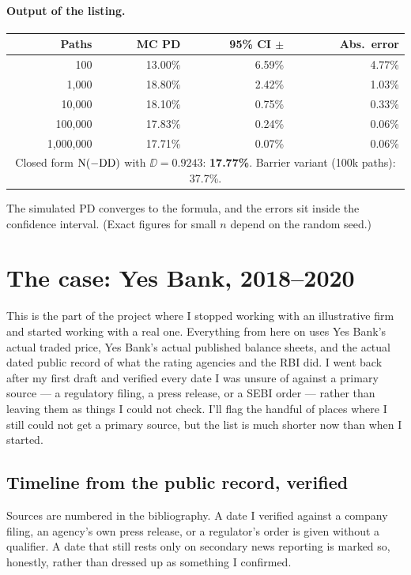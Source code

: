 

\paragraph{Output of the listing.}
\begin{center}\small
\begin{tabular}{rrrr}\toprule
\textbf{Paths} & \textbf{MC PD} & \textbf{95\% CI $\pm$} & \textbf{Abs.\ error}\\\midrule
100 & 13.00\% & 6.59\% & 4.77\%\\
1,000 & 18.80\% & 2.42\% & 1.03\%\\
10,000 & 18.10\% & 0.75\% & 0.33\%\\
100,000 & 17.83\% & 0.24\% & 0.06\%\\
1,000,000 & 17.71\% & 0.07\% & 0.06\%\\\midrule
\multicolumn{4}{c}{Closed form $\mathrm{N}(-\mathrm{DD})$ with $\DD=0.9243$: \textbf{17.77\%}. Barrier variant (100k paths): 37.7\%.}\\\bottomrule
\end{tabular}
\end{center}
The simulated PD converges to the formula, and the errors sit inside the confidence interval. (Exact figures for small $n$ depend on the random seed.)

\section{The case: Yes Bank, 2018--2020}
\label{sec:case}

This is the part of the project where I stopped working with an illustrative firm and started working with a real one. Everything from here on uses Yes Bank's actual traded price, Yes Bank's actual published balance sheets, and the actual dated public record of what the rating agencies and the RBI did. I went back after my first draft and verified every date I was unsure of against a primary source — a regulatory filing, a press release, or a SEBI order — rather than leaving them as things I could not check. I'll flag the handful of places where I still could not get a primary source, but the list is much shorter now than when I started.

\subsection{Timeline from the public record, verified}
Sources are numbered in the bibliography. A date I verified against a company filing, an agency's own press release, or a regulator's order is given without a qualifier. A date that still rests only on secondary news reporting is marked so, honestly, rather than dressed up as something I confirmed.

